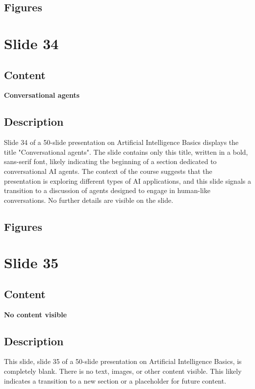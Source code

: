 \documentclass{article}%
\begin{document}
\subsection{Figures}%
\begin{figure}[H]%
\centering%
\end{figure}

%
\newpage%
\section{Slide 34}%
\label{sec:Slide34}%
\subsection{Content}%

\textbf{Conversational agents}
%
\subsection{Description}%
Slide 34 of a 50-slide presentation on Artificial Intelligence Basics displays the title "Conversational agents".  The slide contains only this title, written in a bold, sans-serif font, likely indicating the beginning of a section dedicated to conversational AI agents.  The context of the course suggests that the presentation is exploring different types of AI applications, and this slide signals a transition to a discussion of agents designed to engage in human-like conversations.  No further details are visible on the slide.%
\subsection{Figures}%
\begin{figure}[H]%
\centering%
\end{figure}

%
\newpage%
\section{Slide 35}%
\label{sec:Slide35}%
\subsection{Content}%

\textbf{No content visible}
%
\subsection{Description}%

This slide, slide 35 of a 50-slide presentation on Artificial Intelligence Basics, is completely blank.  There is no text, images, or other content visible.  This likely indicates a transition to a new section or a placeholder for future content.
%
\end{document}
